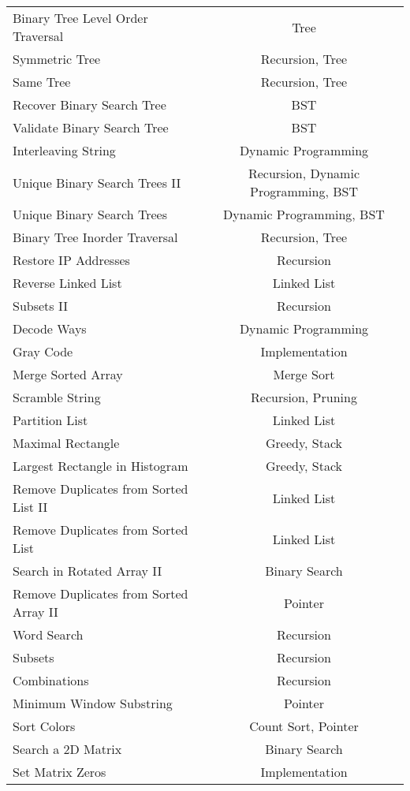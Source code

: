 \documentclass[paper=a4, fontsize=11pt]{scrartcl} %
\begin{document}
\begin{center}
\begin{longtable}{|l|c|}
    Binary Tree Level Order Traversal   &   Tree  \\
    Symmetric Tree  &   Recursion, Tree   \\
    Same Tree   &   Recursion, Tree   \\
    Recover Binary Search Tree  &   BST \\
    Validate Binary Search Tree &   BST \\
    Interleaving String &   Dynamic Programming \\
    Unique Binary Search Trees II   &   Recursion, Dynamic Programming, BST \\
    Unique Binary Search Trees  &   Dynamic Programming, BST \\   
    Binary Tree Inorder Traversal   &   Recursion, Tree  \\
    Restore IP Addresses    &   Recursion  \\
    Reverse Linked List &   Linked List \\
    Subsets II  &   Recursion  \\
    Decode Ways &   Dynamic Programming \\
    Gray Code   &   Implementation  \\
    Merge Sorted Array  &   Merge Sort  \\
    Scramble String &   Recursion, Pruning \\
    Partition List  &   Linked List \\
    Maximal Rectangle   &   Greedy, Stack   \\
    Largest Rectangle in Histogram  &   Greedy, Stack  \\
    Remove Duplicates from Sorted List II &   Linked List \\
    Remove Duplicates from Sorted List  &   Linked List \\
    Search in Rotated Array II  &   Binary Search   \\
    Remove Duplicates from Sorted Array II  &  Pointer  \\
    Word Search &   Recursion  \\
    Subsets &   Recursion  \\
    Combinations    &   Recursion  \\
    Minimum Window Substring    &   Pointer \\
    Sort Colors &   Count Sort, Pointer  \\
    Search a 2D Matrix  &   Binary Search   \\
    Set Matrix Zeros    &   Implementation  \\

\end{longtable}
\end{center}
\end{document}
